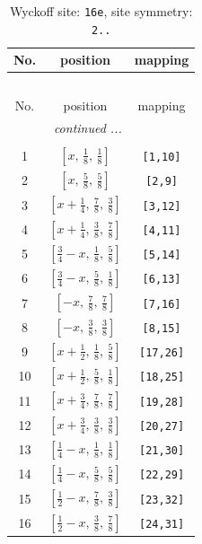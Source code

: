 \documentclass[fleqn,8pt]{jsarticle}
\begin{document}
\renewcommand{\arraystretch}{1.2}
\begin{longtable}{ccc}
\caption{Wyckoff site: {\tt 16e}, site symmetry: {\tt 2..}}
 \\
 \hline \hline
No. & position & mapping \\ \hline \endfirsthead

\multicolumn{2}{l}{\tablename\ \thetable{}} \\
 \hline \hline
No. & position & mapping \\ \hline \endhead

 \hline \hline
\multicolumn{2}{r}{\footnotesize\it continued ...} \\ \endfoot

 \hline \hline
\multicolumn{2}{r}{} \\ \endlastfoot

1 & $\left[ x,\, \frac{1}{8},\, \frac{1}{8} \right]$ & {\tt [1,10]} \\ \hline
2 & $\left[ x,\, \frac{5}{8},\, \frac{5}{8} \right]$ & {\tt [2,9]} \\ \hline
3 & $\left[ x + \frac{1}{4},\, \frac{7}{8},\, \frac{3}{8} \right]$ & {\tt [3,12]} \\ \hline
4 & $\left[ x + \frac{1}{4},\, \frac{3}{8},\, \frac{7}{8} \right]$ & {\tt [4,11]} \\ \hline
5 & $\left[ \frac{3}{4} - x,\, \frac{1}{8},\, \frac{5}{8} \right]$ & {\tt [5,14]} \\ \hline
6 & $\left[ \frac{3}{4} - x,\, \frac{5}{8},\, \frac{1}{8} \right]$ & {\tt [6,13]} \\ \hline
7 & $\left[ - x,\, \frac{7}{8},\, \frac{7}{8} \right]$ & {\tt [7,16]} \\ \hline
8 & $\left[ - x,\, \frac{3}{8},\, \frac{3}{8} \right]$ & {\tt [8,15]} \\ \hline
9 & $\left[ x + \frac{1}{2},\, \frac{1}{8},\, \frac{5}{8} \right]$ & {\tt [17,26]} \\ \hline
10 & $\left[ x + \frac{1}{2},\, \frac{5}{8},\, \frac{1}{8} \right]$ & {\tt [18,25]} \\ \hline
11 & $\left[ x + \frac{3}{4},\, \frac{7}{8},\, \frac{7}{8} \right]$ & {\tt [19,28]} \\ \hline
12 & $\left[ x + \frac{3}{4},\, \frac{3}{8},\, \frac{3}{8} \right]$ & {\tt [20,27]} \\ \hline
13 & $\left[ \frac{1}{4} - x,\, \frac{1}{8},\, \frac{1}{8} \right]$ & {\tt [21,30]} \\ \hline
14 & $\left[ \frac{1}{4} - x,\, \frac{5}{8},\, \frac{5}{8} \right]$ & {\tt [22,29]} \\ \hline
15 & $\left[ \frac{1}{2} - x,\, \frac{7}{8},\, \frac{3}{8} \right]$ & {\tt [23,32]} \\ \hline
16 & $\left[ \frac{1}{2} - x,\, \frac{3}{8},\, \frac{7}{8} \right]$ & {\tt [24,31]} \\
\end{longtable}
\end{document}
